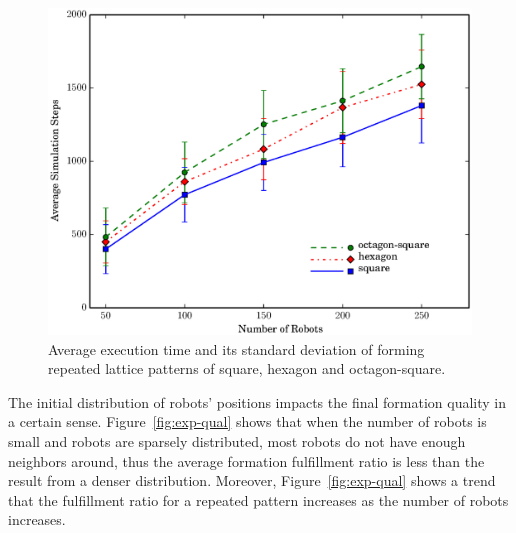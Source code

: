 \begin{figure}
    \centering
   \includegraphics[width=\textwidth]{figs/exp_time}
    \caption{Average execution time and its standard deviation of forming repeated lattice patterns of square, hexagon and octagon-square.} 
    \label{fig:exp-time}
\end{figure}

The initial distribution of robots' positions impacts the final formation quality in a certain sense.
%
Figure~\ref{fig:exp-qual} shows that when the number of robots is small and robots are sparsely distributed, most robots do not have enough neighbors around, thus the average formation fulfillment ratio is less than the result from a denser distribution. 
%
Moreover, Figure~\ref{fig:exp-qual} shows a trend that the fulfillment ratio for
a repeated pattern increases as the number of robots increases.

